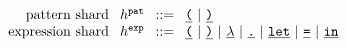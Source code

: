 \begin{figure}[h]
  \[\arraycolsep=4pt\begin{array}{rlrl}
    \text{pattern shard} & \shard^{\pat} & ::= &
      \shardlit{\texttt{(}} ~\vert~
      \shardlit{\texttt{)}} \\
    \text{expression shard} & \shard^{\expr} & ::= &
      \shardlit{\texttt{(}} ~\vert~
      \shardlit{\texttt{)}} ~\vert~
      \shardlit{\lambda} ~\vert~
      \shardlit{\texttt{.}} ~\vert~
      \shardlit{\texttt{let}} ~\vert~
      \shardlit{\texttt{=}} ~\vert~
      \shardlit{\texttt{in}}
  \end{array}\]
\end{figure}

